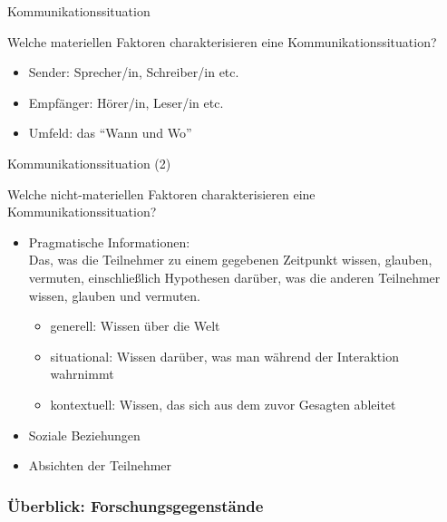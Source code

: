 \begin{frame}{Kommunikationssituation}
  
Welche materiellen Faktoren charakterisieren eine Kommunikationssituation?


\begin{itemize}
\item \alert{Sender}: Sprecher/in, Schreiber/in etc.
\item \alert{Empfänger}: Hörer/in, Leser/in etc.
\item \alert{Umfeld:} das "`Wann und Wo"'
\end{itemize}
\end{frame}



\begin{frame}{Kommunikationssituation (2)}

Welche nicht-materiellen Faktoren charakterisieren eine Kommunikationssituation?

\begin{itemize}
\item \alert{Pragmatische Informationen}:\\
  Das, was die Teilnehmer zu einem gegebenen Zeitpunkt wissen, glauben, vermuten, einschließlich Hypothesen darüber, was die anderen Teilnehmer wissen, glauben und vermuten.\pause
  \begin{itemize}
    \item \alert{generell}: Wissen über die Welt
    \item \alert{situational}: Wissen darüber, was man während der Interaktion wahrnimmt
    \item \alert{kontextuell}: Wissen, das sich aus dem zuvor Gesagten ableitet
  \end{itemize}\pause
\item \alert{Soziale Beziehungen}\pause
\item \alert{Absichten der Teilnehmer}

\end{itemize}


\end{frame}





\subsubsection{Überblick: Forschungsgegenstände}


